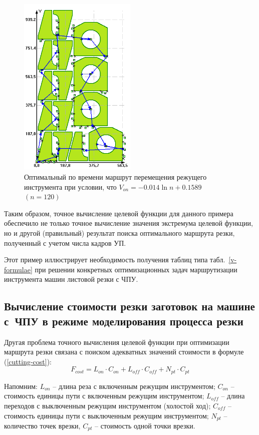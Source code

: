 \documentclass[11pt,twoside,openany]{report}
\begin{document}
\begin{figure}[h]
  \begin{center}
  \includegraphics[width=0.5\textwidth]{amg-optimal.png}
  \caption{
    Оптимальный по времени маршрут
    перемещения режущего инструмента при условии,
    что
    $V_{on}=-0.014 \ln n + 0.1589$
    $(n=120)$
  }
  \label{amg-optimal}
  \end{center}
\end{figure}

Таким образом,
точное вычисление целевой функции для
данного примера обеспечило не только
точное вычисление значения экстремума
целевой функции, но и другой (правильный)
результат поиска оптимального маршрута резки,
полученный  с учетом числа кадров УП.

Этот пример иллюстрирует необходимость
получения таблиц типа табл.~\ref{v-formulae}
при решении конкретных оптимизационных задач
маршрутизации инструмента машин листовой резки с ЧПУ.

\subsection{
  Вычисление стоимости резки заготовок
  на машине с~ЧПУ в режиме моделирования процесса резки
}

Другая проблема точного вычисления целевой функции
при оптимизации маршрута резки связана
с поиском адекватных значений стоимости в формуле (\ref{cutting-cost}):
$$
F_{cost}=
L_{on} \cdot C_{on} +
L_{off} \cdot C_{off} +
N_{pt} \cdot C_{pt}
$$

Напомним:
$L_{on}$ – длина реза с включенным режущим инструментом;
$C_{on}$ – стоимость единицы пути с включенным режущим инструментом;
$L_{off}$ – длина переходов с выключенным режущим инструментом (холостой ход);
$C_{off}$ – стоимость единицы пути с выключенным режущим инструментом;
$N_{pt}$ – количество точек врезки,
$C_{pt}$ – стоимость одной точки врезки.
\end{document}
